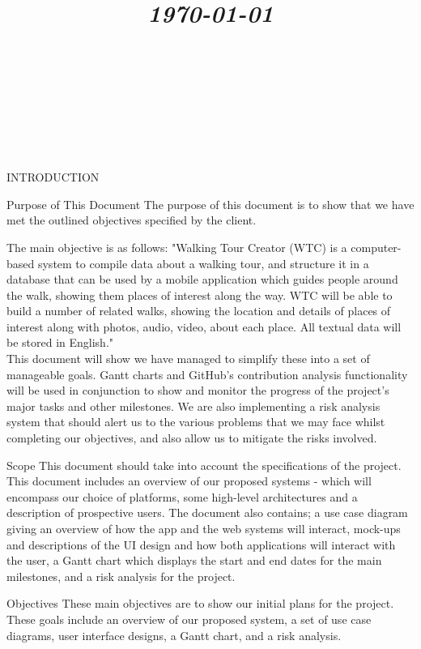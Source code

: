 \documentclass{article}
\title{
	\vspace{1.2in}
	\textmd{\textbf{\doctitle}} \\
	\vspace{0.1in}\large{\textit{\today}} \\
	\vspace{0.4in}
	{\bf{\qanumber}} \\ \vspace{0.4in} %
	\version \\
	\status \\
	\vspace{0.4in}
}
\author{\authors}
\date{}
\begin{document}
	\maketitle
	\newpage
	\tableofcontents
	\newpage

	\begin{section}{INTRODUCTION}
		\begin{subsection}{Purpose of This Document}
			The purpose of this document is to show that we have met the outlined objectives specified by the client. 

The main objective is as follows: "Walking Tour Creator (WTC) is a computer-based system to compile data about a walking tour, and structure it in a database that can be used by a mobile application which guides people around the walk, showing them places of interest along the way. WTC will be able to build a number of related walks, showing the location and details of places of interest along with photos, audio, video, about each place. All textual data will be stored in English." \\

This document will show we have managed to simplify these into a set of manageable goals. Gantt charts and GitHub's contribution analysis functionality will be used in conjunction to show and monitor the progress of the project's major tasks and other milestones. We are also implementing a risk analysis system that should alert us to the various problems that we may face whilst completing our objectives, and also allow us to mitigate the risks involved.
		\end{subsection}
	
		\begin{subsection}{Scope}
			This document should take into account the specifications of the project. This document includes an overview of our proposed systems - which will encompass our choice of platforms, some high-level architectures and a description of prospective users. The document also contains; a use case diagram giving an overview of how the app and the web systems will interact, mock-ups and descriptions of the UI design and how both applications will interact with the user, a Gantt chart which displays the start and end dates for the main milestones, and a risk analysis for the project.
		\end{subsection}
		
		\begin{subsection}{Objectives}
			These main objectives are to show our initial plans for the project. These goals include an overview of our proposed system, a set of use case diagrams, user interface designs, a Gantt chart, and a risk analysis.
			

\end{subsection}
\end{section}
\end{document}
